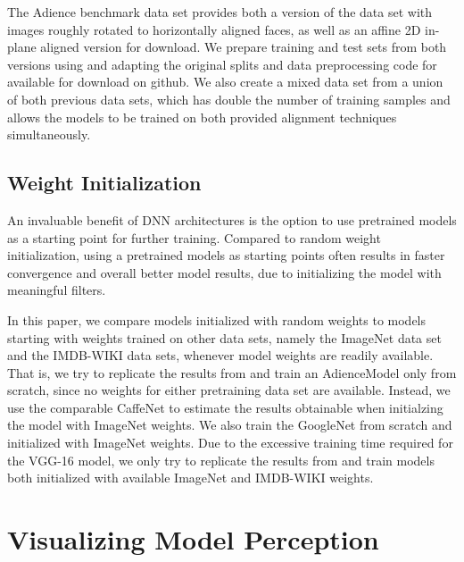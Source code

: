 \documentclass[10pt,twocolumn,letterpaper]{article}
\begin{document}
The Adience benchmark data set provides both a version of the data set with images roughly rotated to horizontally aligned faces, as well as an affine 2D in-plane aligned version for download. We prepare training and test sets from both versions using and adapting the original splits and data preprocessing code for \cite{levi2015age} available for download on github. We also create a mixed data set from a union of both previous data sets, which has double the number of training samples and allows the models to be trained on both provided alignment techniques simultaneously.

\subsection{Weight Initialization}
An invaluable benefit of DNN architectures is the option to use pretrained models as a starting point for further training.
Compared to random weight initialization, using a pretrained models as starting points often results in faster convergence and overall better model results, due to initializing the model with meaningful filters.

In this paper, we compare models initialized with random weights to models starting with weights trained on other data sets, namely the ImageNet data set and the IMDB-WIKI data sets, whenever model weights are readily available. That is, we try to replicate the results from \cite{levi2015age} and train an AdienceModel only from scratch, since no weights for either pretraining data set are available. Instead, we use the comparable CaffeNet to estimate the results obtainable when initialzing the model with ImageNet weights. We also train the GoogleNet from scratch and initialized with ImageNet weights. Due to the excessive training time required for the VGG-16 model, we only try to replicate the results from \cite{rothe2016deep} and train models both initialized with available ImageNet and IMDB-WIKI weights. 




\section{Visualizing Model Perception}
\label{sec:visualizingmodelperception}
\end{document}
